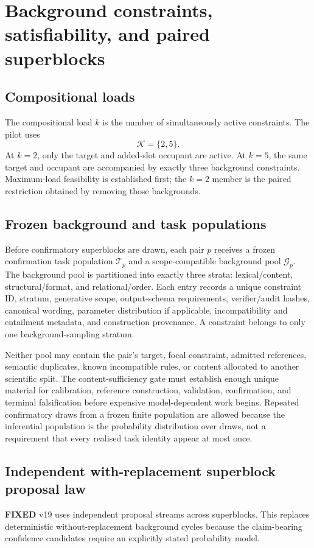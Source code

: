 \documentclass[11pt,a4paper]{article}
\newcommand{\FIXED}{\textbf{FIXED}}
\begin{document}
\section{Background constraints, satisfiability, and paired superblocks}

\subsection{Compositional loads}
The compositional load $k$ is the number of simultaneously active constraints. The pilot uses
\[
\mathcal K=\{2,5\}.
\]
At $k=2$, only the target and added-slot occupant are active. At $k=5$, the same target and occupant are accompanied by exactly three background constraints. Maximum-load feasibility is established first; the $k=2$ member is the paired restriction obtained by removing those backgrounds.

\subsection{Frozen background and task populations}
Before confirmatory superblocks are drawn, each pair $p$ receives a frozen confirmation task population $\mathcal T_p$ and a scope-compatible background pool $\mathcal G_p$. The background pool is partitioned into exactly three strata: lexical/content, structural/format, and relational/order. Each entry records a unique constraint ID, stratum, generative scope, output-schema requirements, verifier/audit hashes, canonical wording, parameter distribution if applicable, incompatibility and entailment metadata, and construction provenance. A constraint belongs to only one background-sampling stratum.

Neither pool may contain the pair's target, focal constraint, admitted references, semantic duplicates, known incompatible rules, or content allocated to another scientific split. The content-sufficiency gate must establish enough unique material for calibration, reference construction, validation, confirmation, and terminal falsification before expensive model-dependent work begins. Repeated confirmatory draws from a frozen finite population are allowed because the inferential population is the probability distribution over draws, not a requirement that every realised task identity appear at most once.

\subsection{Independent with-replacement superblock proposal law}\label{sec:bgsampling}
\FIXED{} v19 uses independent proposal streams across superblocks. This replaces deterministic without-replacement background cycles because the claim-bearing confidence candidates require an explicitly stated probability model.
\end{document}

